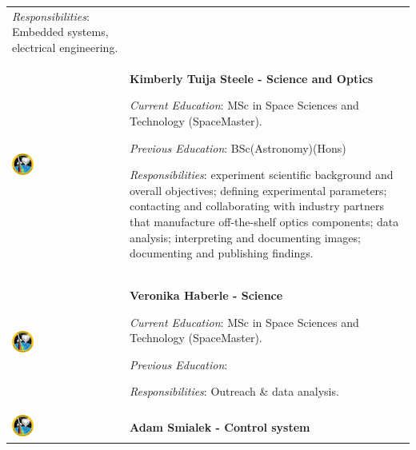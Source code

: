 \begin{longtable}[]{m{} m{}}
\smallskip
\textit{Responsibilities}: Embedded systems, electrical engineering.
\bigskip
\\

\includegraphics[width=0.2\textwidth]{0-cover/img/logo-rexus-bexus.png}  & \textbf{Kimberly Tuija Steele - Science and Optics}

\smallskip
\textit{Current Education}: MSc in Space Sciences and Technology (SpaceMaster).

\smallskip
\textit{Previous Education}: BSc(Astronomy)(Hons)

\smallskip
\textit{Responsibilities}: experiment scientific background and overall objectives; defining experimental parameters; contacting and collaborating with industry partners that manufacture off-the-shelf optics components; data analysis; interpreting and documenting images; documenting and publishing findings.

\bigskip
\\

\includegraphics[width=0.2\textwidth]{0-cover/img/logo-rexus-bexus.png}  & \textbf{Veronika Haberle - Science}

\smallskip
\textit{Current Education}: MSc in Space Sciences and Technology (SpaceMaster).

\smallskip
\textit{Previous Education}:

\smallskip
\textit{Responsibilities}: Outreach \& data analysis.
\bigskip
\\

\includegraphics[width=0.2\textwidth]{0-cover/img/logo-rexus-bexus.png}  & \textbf{Adam Smialek - Control system}


\end{longtable}
